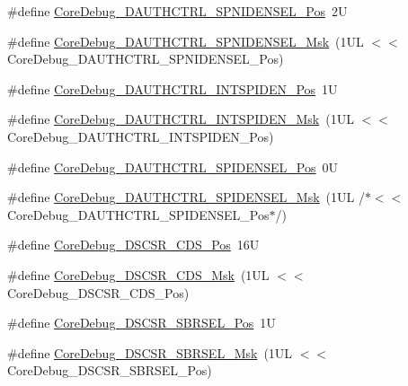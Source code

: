 \begin{DoxyCompactItemize}
\#define \mbox{\hyperlink{group___c_m_s_i_s___core_debug_ga866734a8e4bec2d6cf091e265c6c0f3d}{Core\+Debug\+\_\+\+D\+A\+U\+T\+H\+C\+T\+R\+L\+\_\+\+S\+P\+N\+I\+D\+E\+N\+S\+E\+L\+\_\+\+Pos}}~2U
\item 
\#define \mbox{\hyperlink{group___c_m_s_i_s___core_debug_gaabb5d6c750c9ec50254134ece2111dcd}{Core\+Debug\+\_\+\+D\+A\+U\+T\+H\+C\+T\+R\+L\+\_\+\+S\+P\+N\+I\+D\+E\+N\+S\+E\+L\+\_\+\+Msk}}~(1\+U\+L $<$$<$ Core\+Debug\+\_\+\+D\+A\+U\+T\+H\+C\+T\+R\+L\+\_\+\+S\+P\+N\+I\+D\+E\+N\+S\+E\+L\+\_\+\+Pos)
\item 
\#define \mbox{\hyperlink{group___c_m_s_i_s___core_debug_ga3caef9790e4e2ccbfea77d55315ad59f}{Core\+Debug\+\_\+\+D\+A\+U\+T\+H\+C\+T\+R\+L\+\_\+\+I\+N\+T\+S\+P\+I\+D\+E\+N\+\_\+\+Pos}}~1U
\item 
\#define \mbox{\hyperlink{group___c_m_s_i_s___core_debug_ga1570f149a0f89f70fc2644a5842cbcb4}{Core\+Debug\+\_\+\+D\+A\+U\+T\+H\+C\+T\+R\+L\+\_\+\+I\+N\+T\+S\+P\+I\+D\+E\+N\+\_\+\+Msk}}~(1\+U\+L $<$$<$ Core\+Debug\+\_\+\+D\+A\+U\+T\+H\+C\+T\+R\+L\+\_\+\+I\+N\+T\+S\+P\+I\+D\+E\+N\+\_\+\+Pos)
\item 
\#define \mbox{\hyperlink{group___c_m_s_i_s___core_debug_ga587610b7ac18292de47bf9d675b0b88c}{Core\+Debug\+\_\+\+D\+A\+U\+T\+H\+C\+T\+R\+L\+\_\+\+S\+P\+I\+D\+E\+N\+S\+E\+L\+\_\+\+Pos}}~0U
\item 
\#define \mbox{\hyperlink{group___c_m_s_i_s___core_debug_gaa043fd13768d57be320c682ca1c9b234}{Core\+Debug\+\_\+\+D\+A\+U\+T\+H\+C\+T\+R\+L\+\_\+\+S\+P\+I\+D\+E\+N\+S\+E\+L\+\_\+\+Msk}}~(1\+U\+L /$\ast$$<$$<$ Core\+Debug\+\_\+\+D\+A\+U\+T\+H\+C\+T\+R\+L\+\_\+\+S\+P\+I\+D\+E\+N\+S\+E\+L\+\_\+\+Pos$\ast$/)
\item 
\#define \mbox{\hyperlink{group___c_m_s_i_s___core_debug_ga4be5d0f8af5d7d8ec04bde78ce18e10e}{Core\+Debug\+\_\+\+D\+S\+C\+S\+R\+\_\+\+C\+D\+S\+\_\+\+Pos}}~16U
\item 
\#define \mbox{\hyperlink{group___c_m_s_i_s___core_debug_ga083417245e1aa40e84a2b12433a15a6b}{Core\+Debug\+\_\+\+D\+S\+C\+S\+R\+\_\+\+C\+D\+S\+\_\+\+Msk}}~(1\+U\+L $<$$<$ Core\+Debug\+\_\+\+D\+S\+C\+S\+R\+\_\+\+C\+D\+S\+\_\+\+Pos)
\item 
\#define \mbox{\hyperlink{group___c_m_s_i_s___core_debug_ga7450603163415ab4d4e4a7a767879eae}{Core\+Debug\+\_\+\+D\+S\+C\+S\+R\+\_\+\+S\+B\+R\+S\+E\+L\+\_\+\+Pos}}~1U
\item 
\#define \mbox{\hyperlink{group___c_m_s_i_s___core_debug_gaaffe28a24f05446e55ba3d75bb6f4cd0}{Core\+Debug\+\_\+\+D\+S\+C\+S\+R\+\_\+\+S\+B\+R\+S\+E\+L\+\_\+\+Msk}}~(1\+U\+L $<$$<$ Core\+Debug\+\_\+\+D\+S\+C\+S\+R\+\_\+\+S\+B\+R\+S\+E\+L\+\_\+\+Pos)

\end{DoxyCompactItemize}
